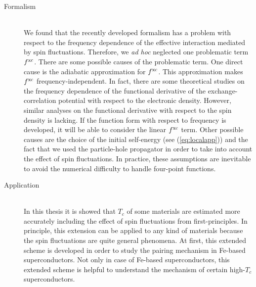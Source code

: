 \begin{description}
	\item[Formalism] \mbox{}\\
We found that the recently developed formalism has a problem with respect to the frequency dependence
of the effective interaction mediated by spin fluctuations. Therefore, we {\it ad hoc} neglected
one problematic term $f^{\rm xc}$. 
There are some possible causes of the problematic term. One direct cause is the adiabatic 
approximation for $f^{\rm xc}$. This approximation makes $f^{\rm xc}$ frequency-independent.
In fact, there are some theoretical studies on the frequency dependence of the functional derivative
of the exchange-correlation potential with respect to the electronic density\cite{Qian2002}.
However, similar analyses on the functional derivative with respect to the spin density is lacking.
If the function form with respect to frequency is developed, it will be able to consider the 
linear $f^{\rm xc}$ term.
Other possible causes are the choice of the initial self-energy (see (\ref{eq:localapp})) and 
the fact that we used the particle-hole propagator in order to take into account the effect of
spin fluctuations. In practice, these assumptions are inevitable to avoid the numerical difficulty 
to handle four-point functions.

\item[Application] \mbox{}\\
	In this thesis it is showed that $T_c$ of some materials are estimated more accurately 
	including the effect of spin fluctuations from first-principles. 
	In principle, this extension can be applied to any 
	kind of materials because the spin fluctuations are quite general phenomena.
	At first, this extended scheme is developed in order to study the pairing mechanism in 
	Fe-based superconductors\cite{Essenberger2016, Lischner2015}. 
	Not only in case of Fe-based superconductors, this extended scheme is helpful to understand 
	the mechanism of certain high-$T_c$ superconductors.


\end{description}


